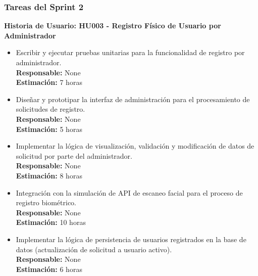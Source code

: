 \documentclass[12pt]{article}
\begin{document}
\subsubsection{Tareas del Sprint 2}
\textbf{Historia de Usuario: HU003 - Registro Físico de Usuario por Administrador}
\begin{itemize}
	\item Escribir y ejecutar pruebas unitarias para la funcionalidad de registro por administrador. \\
	\textbf{Responsable:} None \\
	\textbf{Estimación:} 7 horas
	\item Diseñar y prototipar la interfaz de administración para el procesamiento de solicitudes de registro. \\
	\textbf{Responsable:} None \\
	\textbf{Estimación:} 5 horas
	\item Implementar la lógica de visualización, validación y modificación de datos de solicitud por parte del administrador. \\
	\textbf{Responsable:} None \\
	\textbf{Estimación:} 8 horas
	\item Integración con la simulación de API de escaneo facial para el proceso de registro biométrico. \\
	\textbf{Responsable:} None \\
	\textbf{Estimación:} 10 horas
	\item Implementar la lógica de persistencia de usuarios registrados en la base de datos (actualización de solicitud a usuario activo). \\
	\textbf{Responsable:} None \\
	\textbf{Estimación:} 6 horas
\end{itemize}
\end{document}
